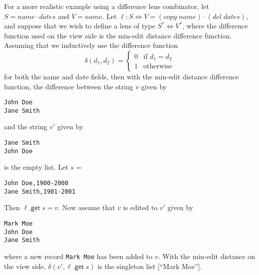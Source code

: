 \documentclass[acmsmall,review,anonymous]{acmart}\settopmatter{printfolios=true,printccs=false,printacmref=false}
\theoremstyle{definition}
\newcommand{\kw}[1]{\ensuremath{\mathsf{#1}}\xspace}
\newcommand{\get}{\ensuremath{\kw{get}}\xspace}
\begin{document}
For a more realistic example using a difference lens combinator, let $S
= name \cdot dates$ and $V = name$. Let $\ell :
S \Leftrightarrow V = (copy \; name) \cdot (del \; dates)$, and suppose that we
wish to define a lens of type $S^* \Leftrightarrow V^*$, where the difference
function used on the view side is the min-edit distance difference function.
Assuming that we inductively use the difference function
$$ \delta(d_1, d_2) =
\begin{cases}
0 & \text{if }d_1 = d_2 \\
1 & \text{otherwise}
\end{cases}
$$
for both the name and date fields, then with the min-edit distance difference
function, the difference between the string $v$ given by
\begin{lstlisting}
John Doe
Jane Smith
\end{lstlisting}
and the string $v'$ given by
\begin{lstlisting}
Jane Smith
John Doe
\end{lstlisting}
is the empty list. Let $s$ =
\begin{lstlisting}
John Doe,1900-2000
Jane Smith,1901-2001
\end{lstlisting}Then $\ell.\get \; s = v$. Now assume that $v$ is edited to $v'$
given by
\begin{lstlisting}
Mark Moe
John Doe
Jane Smith
\end{lstlisting}
where a new record \lstinline|Mark Moe| has been added to $v$.
With the min-edit distance on the view side, $\delta(v', \ell.\get \; s)$ is
the singleton list [``Mark Moe''].
\end{document}
